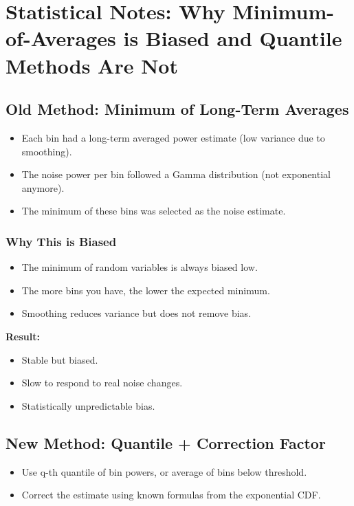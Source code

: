 \section*{Statistical Notes: Why Minimum-of-Averages is Biased and Quantile Methods Are Not}

\subsection*{Old Method: Minimum of Long-Term Averages}

\begin{itemize}
\item Each bin had a long-term averaged power estimate (low variance due to smoothing).
\item The noise power per bin followed a Gamma distribution (not exponential anymore).
\item The minimum of these bins was selected as the noise estimate.
\end{itemize}

\subsubsection*{Why This is Biased}

\begin{itemize}
\item The minimum of random variables is always biased low.
\item The more bins you have, the lower the expected minimum.
\item Smoothing reduces variance but does not remove bias.
\end{itemize}

\textbf{Result:}
\begin{itemize}
\item Stable but biased.
\item Slow to respond to real noise changes.
\item Statistically unpredictable bias.
\end{itemize}

\subsection*{New Method: Quantile + Correction Factor}

\begin{itemize}
\item Use q-th quantile of bin powers, or average of bins below threshold.
\item Correct the estimate using known formulas from the exponential CDF.
\end{itemize}

